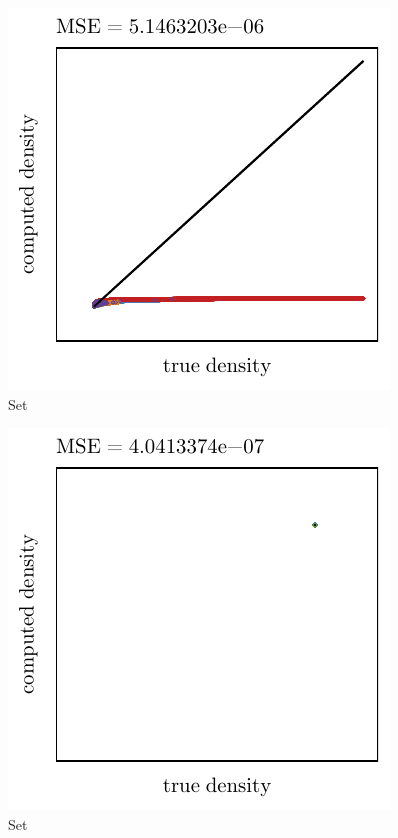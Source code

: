 \begin{subfigure}{0.3\textwidth}
	\centering
	\includegraphics[keepaspectratio=true, width=\textwidth, height=0.23\textheight]{4/img/results_ferdosi_3_120000_mbe_breiman.pdf}
	\caption{Set \ferdosiThree}
	\label{fig:4:simulated:datasets:mbe:ferdosi3}
\end{subfigure}	
\begin{subfigure}{0.3\textwidth}
	\centering
	\includegraphics[keepaspectratio=true, width=\textwidth, height=0.23\textheight]{4/img/results_baakman_4_60000_mbe_breiman.pdf}
	\caption{Set \baakmanFour}
	\label{fig:4:simulated:datasets:mbe:baakman4}
\end{subfigure}	
